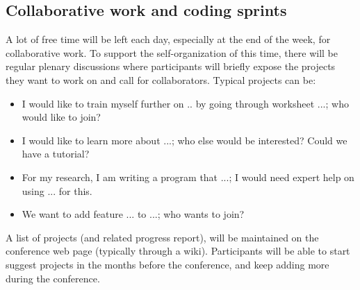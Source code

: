 \documentclass[12pt]{amsbook}
\begin{document}
\subsection{Collaborative work and coding sprints}

A lot of free time will be left each day, especially at the end of the
week, for collaborative work. To support the self-organization of this
time, there will be regular plenary discussions where participants
will briefly expose the projects they want to work on and call for
collaborators. Typical projects can be:
\begin{itemize}
\item I would like to train myself further on .. by going through
  worksheet ...; who would like to join?
\item I would like to learn more about ...; who else would be
  interested? Could we have a tutorial?
\item For my research, I am writing a program that ...; I would need
  expert help on using ... for this.
\item We want to add feature ... to ...; who wants to join?
\end{itemize}

A list of projects (and related progress report), will be maintained
on the conference web page (typically through a wiki). Participants
will be able to start suggest projects in the months before the
conference, and keep adding more during the conference.
\end{document}
